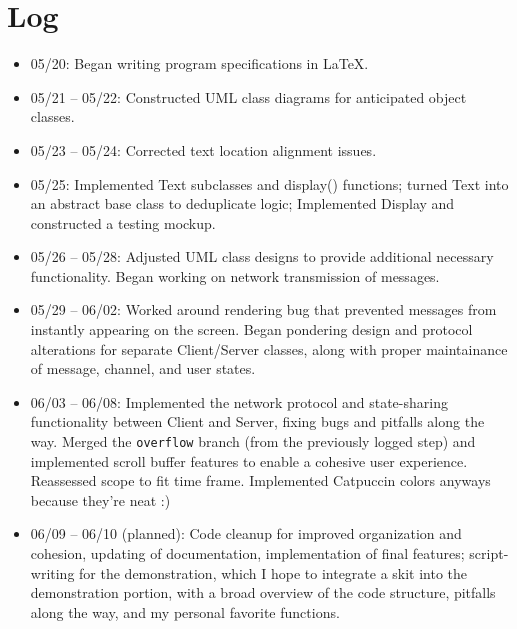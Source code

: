 \documentclass{article}
\begin{document}
\section{Log}
\begin{itemize}
    \item 05/20: Began writing program specifications in \LaTeX.
    \item 05/21 -- 05/22: Constructed UML class diagrams for anticipated object classes.
    \item 05/23 -- 05/24: Corrected text location alignment issues.
    \item 05/25: Implemented Text subclasses and display() functions; turned Text into an abstract base class to deduplicate logic; Implemented Display and constructed a testing mockup.
    \item 05/26 -- 05/28: Adjusted UML class designs to provide additional necessary functionality. Began working on network transmission of messages.
    \item 05/29 -- 06/02: Worked around rendering bug that prevented messages from instantly appearing on the screen. Began pondering design and protocol alterations for separate Client/Server classes, along with proper maintainance of message, channel, and user states.
    \item 06/03 -- 06/08: Implemented the network protocol and state-sharing functionality between Client and Server, fixing bugs and pitfalls along the way. Merged the \verb|overflow| branch (from the previously logged step) and implemented scroll buffer features to enable a cohesive user experience. Reassessed scope to fit time frame. Implemented Catpuccin colors anyways because they're neat :)
    \item 06/09 -- 06/10 (planned): Code cleanup for improved organization and cohesion, updating of documentation, implementation of final features; script-writing for the demonstration, which I hope to integrate a skit into the demonstration portion, with a broad overview of the code structure, pitfalls along the way, and my personal favorite functions.
\end{itemize}
\end{document}
